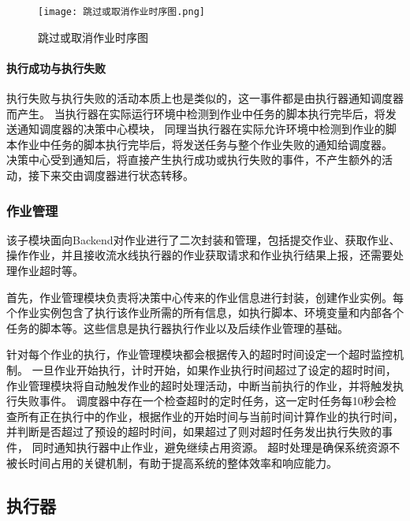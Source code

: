 \begin{figure}[h]
  \centering
  \texttt{[image: 跳过或取消作业时序图.png]}
  \caption{跳过或取消作业时序图}
  \label{fig:跳过或取消作业时序图}
\end{figure}

\paragraph{执行成功与执行失败}
执行失败与执行失败的活动本质上也是类似的，这一事件都是由执行器通知调度器而产生。
当执行器在实际运行环境中检测到作业中任务的脚本执行完毕后，将发送通知调度器的决策中心模块，
同理当执行器在实际允许环境中检测到作业的脚本作业中任务的脚本执行完毕后，将发送任务与整个作业失败的通知给调度器。
决策中心受到通知后，将直接产生执行成功或执行失败的事件，不产生额外的活动，接下来交由调度器进行状态转移。

\subsubsection{作业管理}
该子模块面向Backend对作业进行了二次封装和管理，包括提交作业、获取作业、操作作业，并且接收流水线执行器的作业获取请求和作业执行结果上报，还需要处理作业超时等。

首先，作业管理模块负责将决策中心传来的作业信息进行封装，创建作业实例。每个作业实例包含了执行该作业所需的所有信息，如执行脚本、环境变量和内部各个任务的脚本等。这些信息是执行器执行作业以及后续作业管理的基础。

针对每个作业的执行，作业管理模块都会根据传入的超时时间设定一个超时监控机制。
一旦作业开始执行，计时开始，如果作业执行时间超过了设定的超时时间，作业管理模块将自动触发作业的超时处理活动，中断当前执行的作业，并将触发执行失败事件。
调度器中存在一个检查超时的定时任务，这一定时任务每10秒会检查所有正在执行中的作业，根据作业的开始时间与当前时间计算作业的执行时间，并判断是否超过了预设的超时时间，如果超过了则对超时任务发出执行失败的事件，
同时通知执行器中止作业，避免继续占用资源。
超时处理是确保系统资源不被长时间占用的关键机制，有助于提高系统的整体效率和响应能力。

\subsection{执行器}

